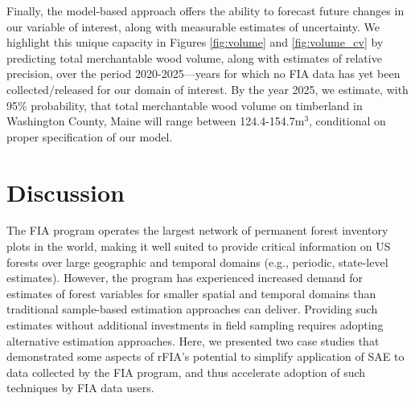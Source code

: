 \documentclass[11pt]{article}
\begin{document}
Finally, the model-based approach offers the ability to forecast future changes in our variable of interest, along with measurable estimates of uncertainty. We highlight this unique capacity in Figures \ref{fig:volume} and \ref{fig:volume_cv} by predicting total merchantable wood volume, along with estimates of relative precision, over the period 2020-2025---years for which no FIA data has yet been collected/released for our domain of interest. By the year 2025, we estimate, with 95\% probability, that total merchantable wood volume on timberland in Washington County, Maine will range between 124.4-154.7$\mathrm{m}^3$, conditional on proper specification of our model. 



\section*{Discussion}
The FIA program operates the largest network of permanent forest inventory plots in the world, making it well suited to provide critical information on US forests over large geographic and temporal domains (e.g., periodic, state-level estimates). However, the program has experienced increased demand for estimates of forest variables for smaller spatial and temporal domains than traditional sample-based estimation approaches can deliver. Providing such estimates without additional investments in field sampling requires adopting alternative estimation approaches. Here, we presented two case studies that demonstrated some aspects of rFIA's potential to simplify application of SAE to data collected by the FIA program, and thus accelerate adoption of such techniques by FIA data users.
\end{document}
